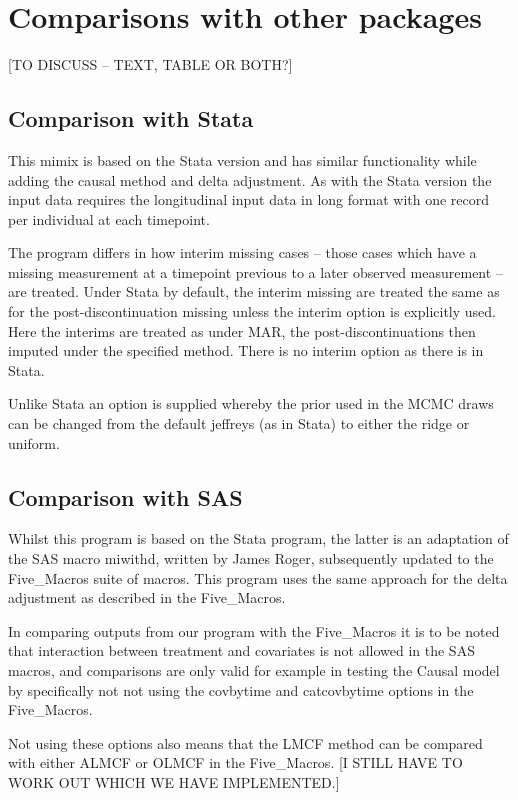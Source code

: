 
\section{Comparisons with other packages}

[TO DISCUSS -- TEXT, TABLE OR BOTH?]

\subsection{Comparison with Stata}
This mimix is based on the Stata version and has similar functionality while adding
the causal method and delta adjustment. 
As with the Stata version the input data requires the longitudinal input data in
long format with one record per individual at each timepoint.

The program differs in how interim missing cases -- those cases which 
have a missing measurement at a timepoint previous to a later observed measurement -- are treated.        
Under Stata by default, the interim missing are treated the same as for the post-discontinuation
missing unless the interim option is explicitly used. 
Here the interims are treated as under MAR, the post-discontinuations then imputed under
the specified method. There is no interim option as there is in Stata.

Unlike Stata an option is supplied whereby the prior used in the MCMC draws can be changed from the 
default jeffreys (as in Stata) to either the ridge or uniform.

\subsection{Comparison with SAS}

Whilst this program is based on the Stata program, the latter is an adaptation of the SAS macro miwithd,
written by James Roger, subsequently updated to the Five\_Macros suite of macros.
This program uses the same approach for the delta adjustment as described in the Five\_Macros.

In comparing outputs from our program with the Five\_Macros it is to be noted that interaction between treatment and covariates
is not allowed in the SAS macros, and comparisons are only valid for example in testing the Causal model by specifically not
not using the covbytime and catcovbytime options in the Five\_Macros.

Not using these options also means that the LMCF method can be compared with either ALMCF or OLMCF in the Five\_Macros.
[I STILL HAVE TO WORK OUT WHICH WE HAVE IMPLEMENTED.]

